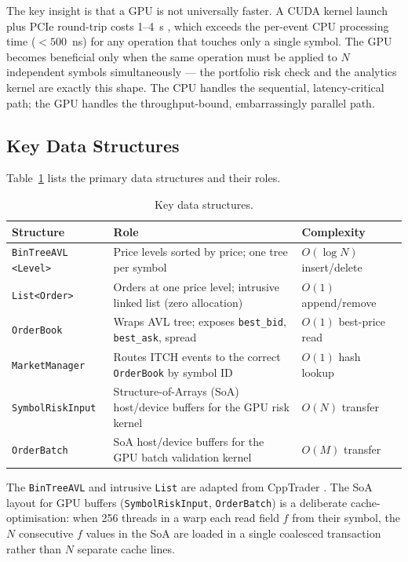 \documentclass[12pt]{article}
\begin{document}
The key insight is that a GPU is not universally faster.
A CUDA kernel launch plus PCIe round-trip costs 1--4~\textmu{}s
\cite{nvidia2024}, which exceeds the per-event CPU processing time
($<500$~ns) for any operation that touches only a single symbol.
The GPU becomes beneficial only when the same operation must be
applied to $N$ independent symbols simultaneously --- the portfolio
risk check and the analytics kernel are exactly this shape.
The CPU handles the sequential, latency-critical path; the GPU handles
the throughput-bound, embarrassingly parallel path.

\subsection{Key Data Structures}

Table~\ref{tab:ds} lists the primary data structures and their roles.

\begin{table}[H]
\centering
\small
\caption{Key data structures.}
\label{tab:ds}
\begin{tabularx}{\textwidth}{@{}p{3.2cm}Xp{3.8cm}@{}}
\toprule
\textbf{Structure} & \textbf{Role} & \textbf{Complexity} \\
\midrule
\texttt{BinTreeAVL} \newline \texttt{<Level>} &
  Price levels sorted by price; one tree per symbol &
  $O(\log N)$ insert/delete \\[2pt]
\texttt{List<Order>} &
  Orders at one price level; intrusive linked list (zero allocation) &
  $O(1)$ append/remove \\[2pt]
\texttt{OrderBook} &
  Wraps AVL tree; exposes \texttt{best\_bid}, \texttt{best\_ask}, spread &
  $O(1)$ best-price read \\[2pt]
\texttt{MarketManager} &
  Routes ITCH events to the correct \texttt{OrderBook} by symbol ID &
  $O(1)$ hash lookup \\[2pt]
\texttt{SymbolRiskInput} &
  Structure-of-Arrays (SoA) host/device buffers for the GPU risk kernel &
  $O(N)$ transfer \\[2pt]
\texttt{OrderBatch} &
  SoA host/device buffers for the GPU batch validation kernel &
  $O(M)$ transfer \\
\bottomrule
\end{tabularx}
\end{table}

The \texttt{BinTreeAVL} and intrusive \texttt{List} are adapted from
CppTrader \cite{cpptrader}.
The SoA layout for GPU buffers (\texttt{SymbolRiskInput},
\texttt{OrderBatch}) is a deliberate cache-optimisation: when 256
threads in a warp each read field $f$ from their symbol, the $N$
consecutive $f$ values in the SoA are loaded in a single coalesced
transaction rather than $N$ separate cache lines.
\end{document}
